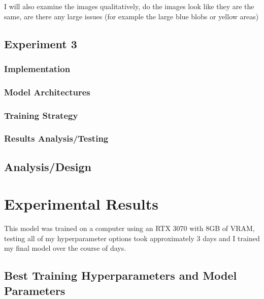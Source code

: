 \documentclass{UoYCSproject}
\begin{document}
I will also examine the images qualitatively, do the images look like they are the same, are there any large issues (for example the large blue blobs or yellow areas)

\section{Experiment 3}

\subsection{Implementation}
\subsection{Model Architectures}
\subsection{Training Strategy}
\subsection{Results Analysis/Testing}

\section{Analysis/Design}


\newpage{}

\chapter{Experimental Results}



This model was trained on a computer using an RTX 3070 with 8GB of VRAM, testing all of my hyperparameter options took approximately 3 days and I trained my final model over the course of 
days.

\section{Best Training Hyperparameters and Model Parameters}
\end{document}
